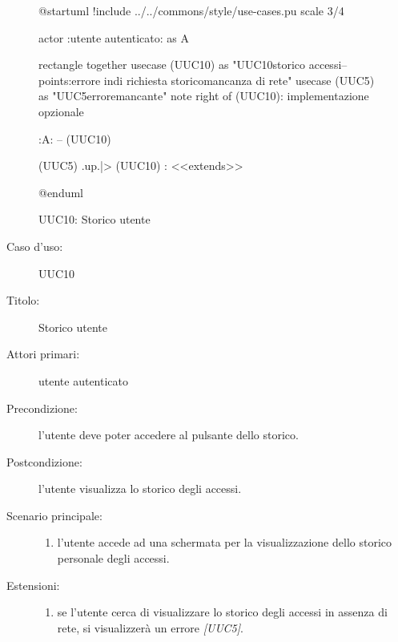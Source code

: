 \documentclass[../../../analisi-dei-requisiti.tex]{subfiles}
\begin{document}
\begin{figure}[h!]
  \centering
  \begin{plantuml}
  @startuml
  !include ../../commons/style/use-cases.pu
  scale 3/4

  actor :utente autenticato: as A

  rectangle {
    together {
      usecase (UUC10) as "UUC10\nVisualizzazione storico accessi\n--\nExtension points:\nVisualizzazione errore in\ncaso di richiesta storico\nin mancanza di rete"
      usecase (UUC5) as "UUC5\nVisualizzazione errore\nrete mancante"
      note right of (UUC10): implementazione opzionale
    }
  }

  :A: -- (UUC10)

  (UUC5) .up.|> (UUC10) : <<extends>>

  @enduml
  \end{plantuml}
  \caption{UUC10: Storico utente}
  \label{fig:uuc10}
\end{figure}

\begin{description}
  \item[Caso d’uso:] UUC10
  \item[Titolo:] Storico utente
  \item[Attori primari:] utente autenticato
  \item[Precondizione:]  l'utente deve poter accedere al pulsante dello storico.
  \item[Postcondizione:] l'utente visualizza lo storico degli accessi.
  \item[Scenario principale:]
        \begin{enumerate}
          \item l'utente accede ad una schermata per la visualizzazione dello storico personale degli accessi.
        \end{enumerate}
  \item[Estensioni:]
        \begin{enumerate}
          \item se l'utente cerca di visualizzare lo storico degli accessi in assenza di rete, si visualizzerà un errore \emph{[UUC5]}.
        \end{enumerate}
\end{description}
\end{document}
